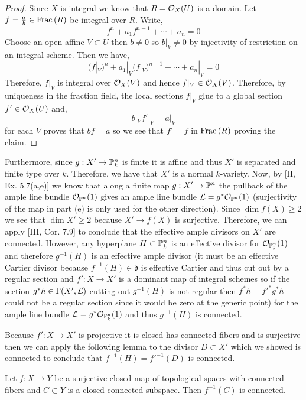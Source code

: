\documentclass[12pt]{article}
\begin{document}
\begin{proof}
Since $X$ is integral we know that $R = \struct{X}(U)$ is a domain. Let $f = \frac{a}{b} \in \Frac{R}$ be integral over $R$. Write,
\[ f^n + a_{1} f^{n-1} + \cdots + a_n = 0 \] 
Choose an open affine $V \subset U$ then $b \neq 0$ so $b|_V \neq 0$ by injectivity of restriction on an integral scheme. Then we have,
\[ (f|_V)^n + a_{1} |_V (f|_V)^{n-1} + \cdots + a_n |_V = 0 \] 
Therefore, $f|_V$ is integral over $\struct{X}(V)$ and hence $f|_V \in \struct{X}(V)$. Therefore, by uniqueness in the fraction field, the local sections $f|_V$ glue to a global section $f' \in \struct{X}(U)$ and,
\[ b|_V f'|_V = a|_V \]
for each $V$ proves that $b f = a$ so we see that $f' = f$ in $\Frac{R}$ proving the claim. 
\end{proof}
\noindent
Furthermore, since $g : X' \to \P^n_k$ is finite it is affine and thus $X'$ is separated and finite type over $k$. Therefore, we have that $X'$ is a normal $k$-variety. Now, by [II, Ex. 5.7(a,e)] we know that along a finite map $g : X' \to \P^n$ the pullback of the ample line bundle $\struct{\P^n}(1)$ gives an ample line bundle $\L = g^* \struct{\P^n}(1)$ (surjectivity of the map in part (e) is only used for the other direction). Since $\dim{f(X)} \ge 2$ we see that $\dim{X'} \ge 2$ because $X' \to f(X)$ is surjective. Therefore, we can apply [III, Cor. 7.9] to conclude that the effective ample divisors on $X'$ are connected. However, any hyperplane $H \subset \P^n_k$ is an effective divisor for $\struct{\P^n_k}(1)$ and therefore $g^{-1}(H)$ is an effective ample divisor (it must be an effective Cartier divisor because $f^{-1}(H) \in \mathfrak{d}$ is effective Cartier and thus cut out by a regular section and $f' : X \to X'$ is a dominant map of integral schemes so if the section $g^* h \in \Gamma(X', \L)$ cutting out $g^{-1}(H)$ is not regular then $f^* h = f'^* g^* h$ could not be a regular section since it would be zero at the generic point) for the ample line bundle $\L = g^* \struct{\P^n_k}(1)$ and thus $g^{-1}(H)$ is connected. 

Because $f' : X \to X'$ is projective it is closed has connected fibers and is surjective then we can apply the following lemma to the divisor $D \subset X'$ which we showed is connected to conclude that $f^{-1}(H) = f'^{-1}(D)$ is connected.

\begin{lemma}
Let $f : X \to Y$ be a surjective closed map of topological spaces with connected fibers and $C \subset Y$ is a closed connected subspace. Then $f^{-1}(C)$ is connected.
\end{lemma}
\end{document}
